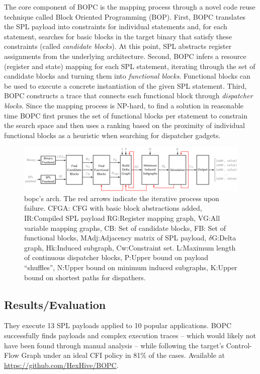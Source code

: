 The core component of BOPC is the mapping process through a novel code reuse technique called Block Oriented Programming (BOP). First, BOPC translates the SPL payload into constraints for individual statements and, for each statement, searches for basic blocks in the target binary that satisfy these constraints (called \emph{candidate blocks}). At this point, SPL abstracts register assignments from the underlying architecture. Second, BOPC infers a resource (register and state) mapping for each SPL statement, iterating through the set of candidate blocks and turning them into \emph{functional blocks}.  Functional blocks can be used to execute a concrete instantiation of the given SPL statement. Third, BOPC constructs a trace that connects each functional block through \emph{dispatcher blocks}. Since the mapping process is NP-hard, to find a solution in reasonable time BOPC first prunes the set of functional blocks per statement to constrain the search space and then uses a ranking based on the proximity of individual functional blocks as a heuristic when searching for dispatcher gadgets.
\begin{figure}[h]
    \centering
    \includegraphics[width=\linewidth]{bopc.png} %
    \caption{\footnotesize{bopc's arch.  The red arrows indicate the iterative process upon failure. CFGA: CFG with basic block abstractions added, IR:Compiled SPL payload RG:Register mapping graph, VG:All variable mapping graphs, CB: Set of candidate blocks, FB: Set of functional blocks, MAdj:Adjacency matrix of SPL payload, $\delta$G:Delta graph, Hk:Induced subgraph, Cw:Constraint set. L:Maximum length of continuous dispatcher blocks, P:Upper bound on payload “shuffles”, N:Upper bound on minimum induced subgraphs, K:Upper bound on shortest paths for dispathers.}}
    \label{fig:bopc}
\end{figure}
\subsection{Results/Evaluation}
They execute 13 SPL payloads applied to 10 popular applications.  BOPC successfully finds payloads and complex execution traces – which would likely not have been found through manual analysis – while following the target’s Control-Flow Graph under an ideal CFI policy in 81\% of the cases. Available at \url{https://github.com/HexHive/BOPC}.

